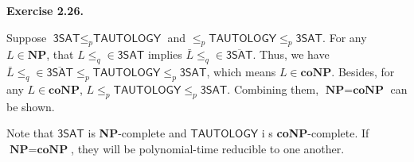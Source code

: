 \documentclass[a4paper]{article}
\newenvironment{exercise}[1]{
	\par
	\noindent\textbf{Exercise #1.}\quad
}{
	\par
	\bigskip
}
\begin{document}
	\begin{exercise}{2.26}
		Suppose $\textsf{3SAT} \leq_p \textsf{TAUTOLOGY}$ and $ \leq_p \textsf{TAUTOLOGY} \leq_p \textsf{3SAT}$. For any $L \in \textbf{NP}$, that $L \leq_q \in \textsf{3SAT}$ implies $\bar L \leq_q \in \overline{\textsf{3SAT}}$. Thus, we have $\bar L \leq_q \in \overline{\textsf{3SAT}} \leq_p \textsf{TAUTOLOGY} \leq_p \textsf{3SAT}$, which means $L \in \textbf{coNP}$. Besides, for any $L \in \textbf{coNP}$, $L \leq_p \textsf{TAUTOLOGY} \leq_p \textsf{3SAT}$. Combining them, $\textbf{NP} = \textbf{coNP}$ can be shown.

		Note that $\textsf{3SAT}$ is \textbf{NP}-complete and $\textsf{TAUTOLOGY}$ i s \textbf{coNP}-complete. If $\textbf{NP} = \textbf{coNP}$, they will be polynomial-time reducible to one another.
	\end{exercise}
\end{document}
